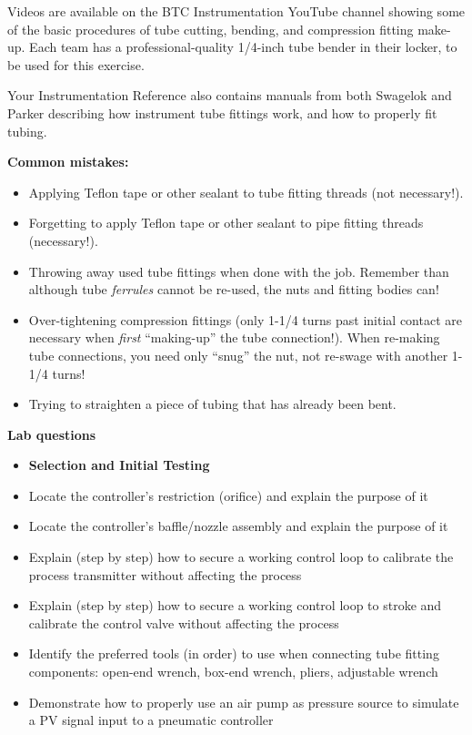 Videos are available on the BTC Instrumentation YouTube channel showing some of the basic procedures of tube cutting, bending, and compression fitting make-up.  Each team has a professional-quality 1/4-inch tube bender in their locker, to be used for this exercise.

Your Instrumentation Reference also contains manuals from both Swagelok and Parker describing how instrument tube fittings work, and how to properly fit tubing.

\vskip 10pt

{\bf Common mistakes:}

\begin{itemize}
\item{} Applying Teflon tape or other sealant to tube fitting threads (not necessary!).
\item{} Forgetting to apply Teflon tape or other sealant to pipe fitting threads (necessary!).
\item{} Throwing away used tube fittings when done with the job.  Remember than although tube {\it ferrules} cannot be re-used, the nuts and fitting bodies can!
\item{} Over-tightening compression fittings (only 1-1/4 turns past initial contact are necessary when {\it first} ``making-up'' the tube connection!).  When re-making tube connections, you need only ``snug'' the nut, not re-swage with another 1-1/4 turns!
\item{} Trying to straighten a piece of tubing that has already been bent.
\end{itemize}







\vfil \eject

\noindent
{\bf Lab questions}

\vskip 5pt

\begin{itemize}
\item{} {\bf Selection and Initial Testing}
\item{} Locate the controller's restriction (orifice) and explain the purpose of it
\item{} Locate the controller's baffle/nozzle assembly and explain the purpose of it
\item{} Explain (step by step) how to secure a working control loop to calibrate the process transmitter without affecting the process
\item{} Explain (step by step) how to secure a working control loop to stroke and calibrate the control valve without affecting the process
\item{} Identify the preferred tools (in order) to use when connecting tube fitting components: open-end wrench, box-end wrench, pliers, adjustable wrench
\item{} Demonstrate how to properly use an air pump as pressure source to simulate a PV signal input to a pneumatic controller
\end{itemize}

